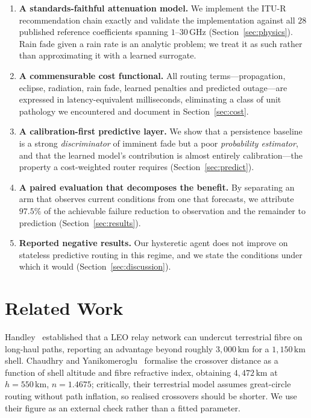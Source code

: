 \documentclass[10pt,twocolumn]{article}
\newcommand{\km}{\,\mathrm{km}}
\newcommand{\GHz}{\,\mathrm{GHz}}
\begin{document}
\begin{enumerate}
\item \textbf{A standards-faithful attenuation model.} We implement the ITU-R
recommendation chain exactly and validate the implementation against all $28$
published reference coefficients spanning $1$--$30\GHz$
(Section~\ref{sec:physics}). Rain fade given a rain rate is an analytic problem;
we treat it as such rather than approximating it with a learned surrogate.

\item \textbf{A commensurable cost functional.} All routing terms---propagation,
eclipse, radiation, rain fade, learned penalties and predicted outage---are
expressed in latency-equivalent milliseconds, eliminating a class of unit
pathology we encountered and document in Section~\ref{sec:cost}.

\item \textbf{A calibration-first predictive layer.} We show that a persistence
baseline is a strong \emph{discriminator} of imminent fade but a poor
\emph{probability estimator}, and that the learned model's contribution is
almost entirely calibration---the property a cost-weighted router requires
(Section~\ref{sec:predict}).

\item \textbf{A paired evaluation that decomposes the benefit.} By separating an
arm that observes current conditions from one that forecasts, we attribute
$97.5\%$ of the achievable failure reduction to observation and the remainder to
prediction (Section~\ref{sec:results}).

\item \textbf{Reported negative results.} Our hysteretic agent does not improve
on stateless predictive routing in this regime, and we state the conditions
under which it would (Section~\ref{sec:discussion}).
\end{enumerate}

\section{Related Work}

Handley~\cite{handley2018} established that a LEO relay network can undercut
terrestrial fibre on long-haul paths, reporting an advantage beyond roughly
$3{,}000\km$ for a $1{,}150\km$ shell. Chaudhry and
Yanikomeroglu~\cite{chaudhry2022} formalise the crossover distance as a function
of shell altitude and fibre refractive index, obtaining $4{,}472\km$ at
$h=550\km$, $n=1.4675$; critically, their terrestrial model assumes great-circle
routing without path inflation, so realised crossovers should be shorter. We use
their figure as an external check rather than a fitted parameter.
\end{document}
